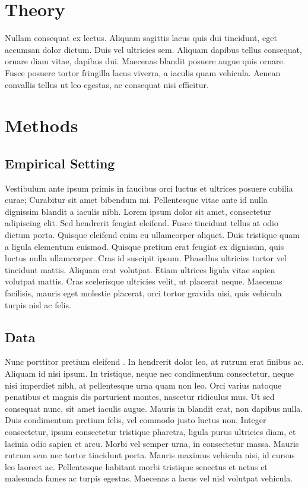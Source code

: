 \documentclass[11pt,letterpaper]{article} %
\begin{document}
	\section*{Theory}
	Nullam consequat ex lectus. Aliquam sagittis lacus quis dui tincidunt, eget accumsan dolor dictum. Duis vel ultricies sem. Aliquam dapibus tellus consequat, ornare diam vitae, dapibus dui. Maecenas blandit posuere augue quis ornare. Fusce posuere tortor fringilla lacus viverra, a iaculis quam vehicula. Aenean convallis tellus ut leo egestas, ac consequat nisi efficitur.
	
	\section*{Methods}
	\subsection*{Empirical Setting}
	Vestibulum ante ipsum primis in faucibus orci luctus et ultrices posuere cubilia curae; Curabitur sit amet bibendum mi. Pellentesque vitae ante id nulla dignissim blandit a iaculis nibh. Lorem ipsum dolor sit amet, consectetur adipiscing elit. Sed hendrerit feugiat eleifend. Fusce tincidunt tellus at odio dictum porta. Quisque eleifend enim eu ullamcorper aliquet. Duis tristique quam a ligula elementum euismod. Quisque pretium erat feugiat ex dignissim, quis luctus nulla ullamcorper. Cras id suscipit ipsum. Phasellus ultricies tortor vel tincidunt mattis. Aliquam erat volutpat. Etiam ultrices ligula vitae sapien volutpat mattis. Cras scelerisque ultricies velit, ut placerat neque. Maecenas facilisis, mauris eget molestie placerat, orci tortor gravida nisi, quis vehicula turpis nisl ac felis.
	
	\subsection*{Data}
	Nunc porttitor pretium eleifend \citep{sinatra_quantifying_2016}. In hendrerit dolor leo, at rutrum erat finibus ac. Aliquam id nisi ipsum. In tristique, neque nec condimentum consectetur, neque nisi imperdiet nibh, at pellentesque urna quam non leo. Orci varius natoque penatibus et magnis dis parturient montes, nascetur ridiculus mus. Ut sed consequat nunc, sit amet iaculis augue. Mauris in blandit erat, non dapibus nulla. Duis condimentum pretium felis, vel commodo justo luctus non. Integer consectetur, ipsum consectetur tristique pharetra, ligula purus ultricies diam, et lacinia odio sapien et arcu. Morbi vel semper urna, in consectetur massa. Mauris rutrum sem nec tortor tincidunt porta. Mauris maximus vehicula nisi, id cursus leo laoreet ac. Pellentesque habitant morbi tristique senectus et netus et malesuada fames ac turpis egestas. Maecenas a lacus vel nisl volutpat vehicula.
	
\end{document}
